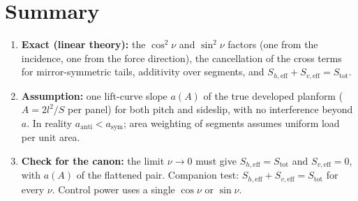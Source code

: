 \documentclass[11pt,a4paper]{article}
\begin{document}
\section*{Summary}
\begin{enumerate}
  \item \textbf{Exact (linear theory):} the $\cos^2\nu$ and $\sin^2\nu$ factors (one from the
        incidence, one from the force direction), the cancellation of the cross terms for
        mirror-symmetric tails, additivity over segments, and
        $S_{h,\mathrm{eff}}+S_{v,\mathrm{eff}}=S_\mathrm{tot}$.
  \item \textbf{Assumption:} one lift-curve slope $a(A)$ of the true developed planform
        ($A=2l^2/S$ per panel) for both pitch and sideslip, with no interference beyond $a$. In
        reality $a_\mathrm{anti}<a_\mathrm{sym}$; area weighting of segments assumes uniform load
        per unit area.
  \item \textbf{Check for the canon:} the limit $\nu\to0$ must give $S_{h,\mathrm{eff}}=S_\mathrm{tot}$
        and $S_{v,\mathrm{eff}}=0$, with $a(A)$ of the flattened pair. Companion test:
        $S_{h,\mathrm{eff}}+S_{v,\mathrm{eff}}=S_\mathrm{tot}$ for every $\nu$. Control power
        uses a single $\cos\nu$ or $\sin\nu$.
\end{enumerate}
\end{document}
